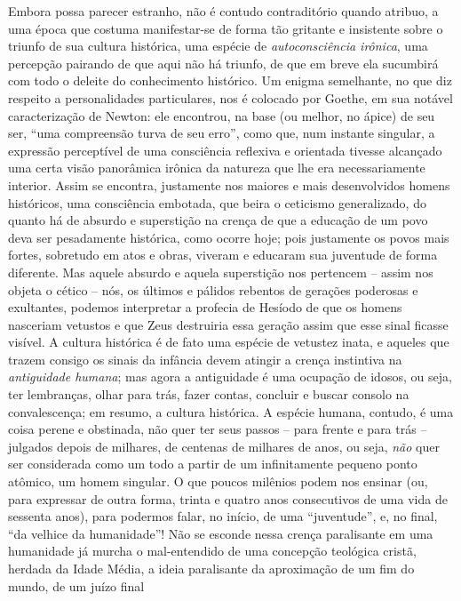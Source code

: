 Embora possa parecer estranho, não é contudo contraditório quando
atribuo, a uma época que costuma manifestar-se de forma tão gritante e
insistente sobre o triunfo de sua cultura histórica, uma espécie de
\emph{autoconsciência irônica}, uma percepção pairando de que aqui não
há triunfo, de que em breve ela sucumbirá com todo o deleite do
conhecimento histórico. Um enigma semelhante, no que diz respeito a
personalidades particulares, nos é colocado por Goethe, em sua notável
caracterização de Newton: ele encontrou, na base (ou melhor, no ápice)
de seu ser, ``uma compreensão turva de seu erro'', como que, num
instante singular, a expressão perceptível de uma consciência reflexiva
e orientada tivesse alcançado uma certa visão panorâmica irônica da
natureza que lhe era necessariamente interior. Assim se encontra,
justamente nos maiores e mais desenvolvidos homens históricos, uma
consciência embotada, que beira o ceticismo generalizado, do quanto há
de absurdo e superstição na crença de que a educação de um povo deva ser
pesadamente histórica, como ocorre hoje; pois justamente os povos mais
fortes, sobretudo em atos e obras, viveram e educaram sua juventude de
forma diferente. Mas aquele absurdo e aquela superstição nos pertencem
-- assim nos objeta o cético -- nós, os últimos e pálidos rebentos de
gerações poderosas e exultantes, podemos interpretar a profecia de
Hesíodo de que os homens nasceriam vetustos e que Zeus destruiria essa
geração assim que esse sinal ficasse visível. A cultura histórica é de
fato uma espécie de vetustez inata, e aqueles que trazem consigo os
sinais da infância devem atingir a crença instintiva na
\emph{antiguidade humana}; mas agora a antiguidade é uma ocupação de
idosos, ou seja, ter lembranças, olhar para trás, fazer contas, concluir
e buscar consolo na convalescença; em resumo, a cultura histórica. A
espécie humana, contudo, é uma coisa perene e obstinada, não quer ter
seus passos -- para frente e para trás -- julgados depois de milhares,
de centenas de milhares de anos, ou seja, \emph{não} quer ser
considerada como um todo a partir de um infinitamente pequeno ponto
atômico, um homem singular. O que poucos milênios podem nos ensinar (ou,
para expressar de outra forma, trinta e quatro anos consecutivos de uma
vida de sessenta anos), para podermos falar, no início, de uma
``juventude'', e, no final, ``da velhice da humanidade''! Não se esconde
nessa crença paralisante em uma humanidade já murcha o mal-entendido de
uma concepção teológica cristã, herdada da Idade Média, a ideia
paralisante da aproximação de um fim do mundo, de um juízo final
